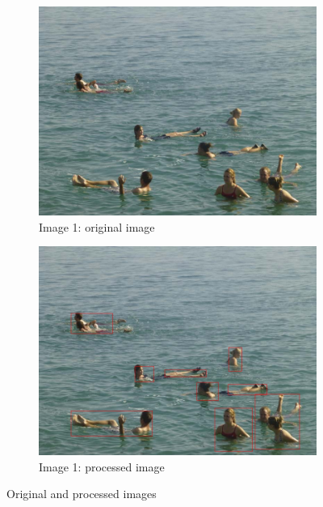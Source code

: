 \begin{figure}[h]
        \centering
        \begin{subfigure}[h]{0.3\textwidth}
                \includegraphics[width=\textwidth]{Images/ocean7}
                \caption{Image 1: original image}
        \end{subfigure}%
        \quad
        \begin{subfigure}[h]{0.3\textwidth}
                \includegraphics[width=\textwidth]{Images/final}
                \caption{Image 1: processed image}
        \end{subfigure}
        \caption{Original and processed images}
        \label{fig:original_final}
\end{figure}

